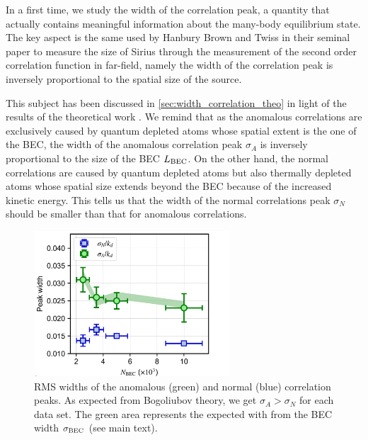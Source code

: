 \label{ref:exp_width_corr}

In a first time, we study the width of the correlation peak, a quantity that actually contains meaningful information about the many-body equilibrium state. The key aspect is the same used by Hanbury Brown and Twiss in their seminal paper to measure the size of Sirius through the measurement of the second order correlation function in far-field, namely the width of the correlation peak is inversely proportional to the spatial size of the source. 


This subject has been discussed in \ref{sec:width_correlation_theo} in light of the results of the theoretical work \cite{butera2020}. We remind that as the anomalous correlations are exclusively caused by quantum depleted atoms whose spatial extent is the one of the BEC, the width of the anomalous correlation peak $\sigma_A$ is inversely proportional to the size of the BEC $L_{\rm{BEC}}$. On the other hand, the normal correlations are caused by quantum depleted atoms but also thermally depleted atoms whose spatial size extends beyond the BEC because of the increased kinetic energy. This tells us that the width of the normal correlations peak $\sigma_N$ should be smaller than that for anomalous correlations.

\begin{figure}
    \centering
    \includegraphics[width=0.65\textwidth]{Fig/Chapter4/widths.png}
    \caption[RMS widths of the anomalous and normal correlation peaks]{RMS widths of the anomalous (green) and normal (blue) correlation peaks. As expected from Bogoliubov theory, we get $\sigma_A > \sigma_N$ for each data set. The green area represents the expected with from the BEC width $\sigma_{\rm{BEC}}$ (see main text).}
    \label{fig:width}
\end{figure}

